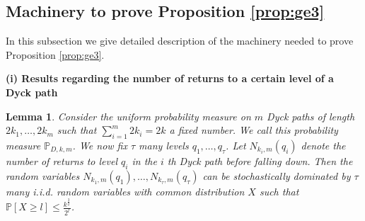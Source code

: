 \documentclass[12pt]{article}
\numberwithin{equation}{section}
\newtheorem{lemma}{Lemma}[section]
\numberwithin{equation}{section}
\theoremstyle{definition}
\renewcommand{\1}{\bf 1}
\begin{document}
\subsection{Machinery to prove Proposition \ref{prop:ge3}}
In this subsection we give detailed description of the machinery needed to prove Proposition \ref{prop:ge3}.

\noindent
\textbf{(i) Results regarding the number of returns to a certain level of a Dyck path}
\begin{lemma}\label{lem:universal}
Consider the uniform probability measure on $m$ Dyck paths of length $2k_{1},\ldots, 2k_{m}$ such that $\sum_{i=1}^{m} 2k_{i}= 2k$ a fixed number. We call this probability measure $\mathbb{P}_{D,k,m}$. We now fix $\tau$ many levels $q_{1},\ldots, q_{\tau}$. Let $N_{k_{i},m}(q_{i})$ denote the number of returns to level $q_{i}$ in the $i$ th Dyck path before falling down. Then the random variables $N_{k_{1},m}(q_{1}),\ldots , N_{k_{\tau},m}(q_{\tau})$ can be stochastically dominated by $\tau$ many i.i.d. random variables with common distribution $X$ such that $\mathbb{P}\left[X\ge l\right]\le \frac{k^{\frac{3}{2}}}{2^{l}}$.  


\end{lemma} 
\end{document}
